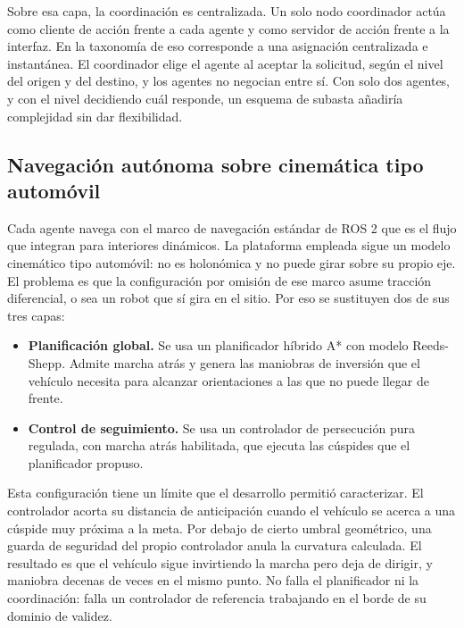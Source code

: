 Sobre esa capa, la coordinación es centralizada. Un solo nodo coordinador actúa
como cliente de acción frente a cada agente y como servidor de acción frente a la
interfaz. En la taxonomía de \textcite{gerkey2004taxonomy} eso
corresponde a una asignación centralizada e instantánea. El coordinador elige el
agente al aceptar la solicitud, según el nivel del origen y del destino, y los
agentes no negocian entre sí. Con solo dos agentes, y con el nivel decidiendo
cuál responde, un esquema de subasta añadiría complejidad sin dar flexibilidad.

\subsection{Navegación autónoma sobre cinemática tipo automóvil}

Cada agente navega con el marco de navegación estándar de ROS 2
que es el flujo que \textcite{sojan2025autonomous} integran para interiores
dinámicos. La plataforma empleada sigue un modelo cinemático
tipo automóvil: no es holonómica y no puede girar sobre su propio eje. El
problema es que la configuración por omisión de ese marco asume tracción
diferencial, o sea un robot que sí gira en el sitio. Por eso se sustituyen dos de
sus tres capas:

\begin{itemize}[leftmargin=*]
  \item \textbf{Planificación global.} Se usa un planificador híbrido A* con
    modelo Reeds-Shepp. Admite marcha atrás y genera las maniobras de inversión
    que el vehículo necesita para alcanzar orientaciones a las que no puede
    llegar de frente.
  \item \textbf{Control de seguimiento.} Se usa un controlador de persecución
    pura regulada, con marcha atrás habilitada, que ejecuta las cúspides que el
    planificador propuso.
\end{itemize}

Esta configuración tiene un límite que el desarrollo permitió caracterizar. El
controlador acorta su distancia de anticipación cuando el vehículo se acerca a
una cúspide muy próxima a la meta. Por debajo de cierto umbral geométrico, una
guarda de seguridad del propio controlador anula la curvatura calculada. El
resultado es que el vehículo sigue invirtiendo la marcha pero deja de dirigir, y
maniobra decenas de veces en el mismo punto. No falla el planificador ni la
coordinación: falla un controlador de referencia trabajando en el borde de su
dominio de validez.

